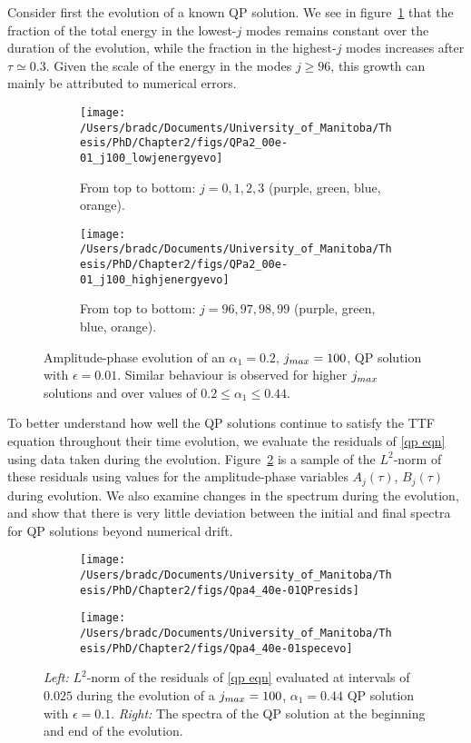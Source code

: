 \documentclass[../PhD.tex]{subfiles}
\begin{document}
Consider first the evolution of a known QP solution. We see in figure~\ref{fig:qpevo} that the fraction of the total energy in the lowest-$j$ modes remains constant over the duration of the evolution, while the fraction in the highest-$j$ modes increases after $\tau \simeq 0.3$. Given the scale of the energy in the modes $j \geq 96$, this growth can mainly be attributed to numerical errors.

\begin{figure}[h]
	\centering
	\begin{subfigure}[t]{0.45\textwidth}
		\texttt{[image: /Users/bradc/Documents/University\_of\_Manitoba/Thesis/PhD/Chapter2/figs/QPa2\_00e-01\_j100\_lowjenergyevo]}
		\caption{From top to bottom: $j=0, 1, 2, 3$ (purple, green, blue, orange).}
	\end{subfigure}
	\;
	\begin{subfigure}[t]{0.45\textwidth}
		\texttt{[image: /Users/bradc/Documents/University\_of\_Manitoba/Thesis/PhD/Chapter2/figs/QPa2\_00e-01\_j100\_highjenergyevo]}
		\caption{From top to bottom: $j=96, 97, 98, 99$ (purple, green, blue, orange).}
	\end{subfigure}
	\caption[Evolution of QP solutions at low temperature for different truncation values]{Amplitude-phase evolution of an $\alpha_1 = 0.2$, $j_{max} = 100$, QP solution with $\epsilon=0.01$. Similar behaviour is observed for higher $j_{max}$ solutions and over values of $0.2 \leq \alpha_1 \leq 0.44$.}
	\label{fig:qpevo}
\end{figure}

To better understand how well the QP solutions continue to satisfy the TTF equation throughout their time evolution, we evaluate the residuals of \eqref{qp eqn} using data taken during the evolution. Figure~\ref{fig: Qpa4_40e-01QPresids} is a sample of the $L^2$-norm of these residuals using values for the amplitude-phase variables $A_j(\tau)$, $B_j(\tau)$ during evolution. We also examine changes in the spectrum during the evolution, and show that there is very little deviation between the initial and final spectra for QP solutions beyond numerical drift.

\begin{figure}[h]
	\centering
	\begin{subfigure}[t]{0.45\textwidth}
		\texttt{[image: /Users/bradc/Documents/University\_of\_Manitoba/Thesis/PhD/Chapter2/figs/Qpa4\_40e-01QPresids]}
	\end{subfigure}
	\;
	\begin{subfigure}[t]{0.45\textwidth}
		\texttt{[image: /Users/bradc/Documents/University\_of\_Manitoba/Thesis/PhD/Chapter2/figs/Qpa4\_40e-01specevo]}
	\end{subfigure}
	\caption[Residual and spectrum of a low-temperature QP solution during evolution]{{\it Left:} $L^2$-norm of the residuals of \eqref{qp eqn} evaluated at intervals of $0.025$ during the evolution of a $j_{max} = 100$, $\alpha_1 = 0.44$ QP solution with $\epsilon = 0.1$. {\it Right:} The spectra of the QP solution at the beginning and end of the evolution.}
	\label{fig: Qpa4_40e-01QPresids}
\end{figure}
\end{document}

